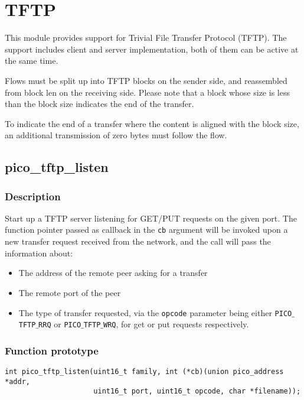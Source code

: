 \section{TFTP}

This module provides support for Trivial File Transfer Protocol (TFTP).
The support includes client and server implementation, both of them can be active at the same time.

Flows must be split up into TFTP blocks on the sender side, and reassembled from block len
on the receiving side. Please note that a block whose size is less than the block size indicates
the end of the transfer. 

To indicate the end of a transfer where the content is aligned with the block size, an additional  
transmission of zero bytes must follow the flow.


\subsection{pico\_tftp\_listen}

\subsubsection*{Description}
Start up a TFTP server listening for GET/PUT requests on the given port.
The function pointer passed as callback in the \texttt{cb} argument will be invoked upon a new
transfer request received from the network, and the call will pass the information about:
\begin{itemize}[noitemsep]
\item The address of the remote peer asking for a transfer
\item The remote port of the peer
\item The type of transfer requested, via the \texttt{opcode} parameter being either \texttt{PICO$\_$TFTP$\_$RRQ} or \texttt{PICO$\_$TFTP$\_$WRQ}, for get or put requests respectively.
\end{itemize}


\subsubsection*{Function prototype}
\begin{verbatim}
int pico_tftp_listen(uint16_t family, int (*cb)(union pico_address *addr,
                     uint16_t port, uint16_t opcode, char *filename));
\end{verbatim}

